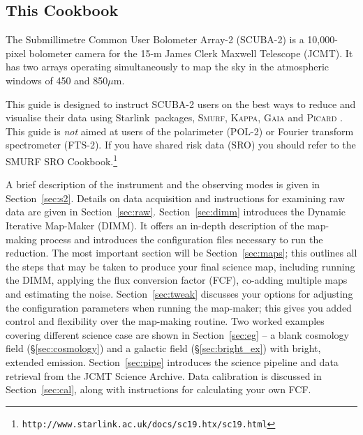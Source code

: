 \documentclass[twoside,11pt]{article}
\newcommand{\htmladdnormallink}[2]{#1}
\newcommand{\htmlref}[2]{#1}
\newenvironment{latexonly}{}{}
\newcommand{\latex}[1]{#1}
\newcommand{\latexhtml}[2]{#1}
\newcommand{\xref}[3]{#1}
\newcommand{\xlabel}[1]{}
\renewcommand{\_}{\texttt{\symbol{95}}}
\newcommand{\starlink}{\htmladdnormallink{Starlink}{http://starlink.jach.hawaii.edu}}
\newcommand{\gaia}{\xref{\textsc{Gaia}}{sun214}{}}
\newcommand{\Kappa}{\xref{\textsc{Kappa}}{sun95}{}}
\newcommand{\picard}{\xref{\textsc{Picard}}{sun265}{}}
\newcommand{\smurf}{\xref{\textsc{Smurf}}{sun258}{}}
\newcommand{\cref}[3]{\latexhtml{#1~\ref{#2}}{\htmlref{#3}{#2}}}
\begin{document}
\subsection{\xlabel{using_guide}This Cookbook}

The Submillimetre Common User Bolometer Array-2 (SCUBA-2) is a
10,000-pixel bolometer camera for the 15-m James Clerk Maxwell
Telescope (JCMT). It has two arrays operating simultaneously to map
the sky in the atmospheric windows of 450 and 850$\mu$m.

This guide is designed to instruct SCUBA-2 users on the best ways to
reduce and visualise their data using \starlink\ packages,
\smurf \cite{smurf}, \Kappa \cite{kappa}, \gaia \cite{gaia} and \picard
\cite{picard}.  This guide is {\em not} aimed at users of the
polarimeter (POL-2) or Fourier transform spectrometer (FTS-2). If you
have shared risk data (SRO) you should refer to the
\xref{SMURF SRO
Cookbook.}{sc19}{}\latex{\footnote{\texttt{http://www.starlink.ac.uk/docs/sc19.htx/sc19.html}}}

A brief description of the instrument and the observing modes is given
in \cref{Section}{sec:s2}{an Overview}. Details on data acquisition and
instructions for examining raw data are given in
\cref{Section}{sec:raw}{Raw SCUBA-2 data}.
\cref{Section}{sec:dimm}{This page} introduces the Dynamic Iterative Map-Maker
(DIMM). It offers an in-depth description of the map-making
process and introduces the configuration files necessary to run the
reduction. The most important section will be
\cref{Section}{sec:maps}{Reducing your data};
this outlines all the steps that may be taken to produce your final
science map, including running the DIMM, applying the flux conversion
factor (FCF), co-adding multiple maps and estimating the noise.
\cref{Section}{sec:tweak}{Tweaking the configuration file}
discusses your options for adjusting the configuration
parameters when running the map-maker; this gives you added control
and flexibility over the map-making routine. Two worked examples
covering different science case are shown in
\cref{Section}{sec:eg}{Examples} -- a
\htmlref{blank cosmology field}{sec:cosmology}
\begin{latexonly}
(\S\ref{sec:cosmology})
\end{latexonly}
and a \htmlref{galactic field}{sec:bright_ex}
\begin{latexonly}
(\S\ref{sec:bright_ex})
\end{latexonly}
with bright, extended emission.
\cref{Section}{sec:pipe}{SCUBA-2 Pipeline} introduces the science
pipeline and data retrieval from the JCMT Science Archive.  Data
calibration is discussed in \cref{Section}{sec:cal}{SCUBA-2 data
calibration}, along with instructions for calculating your own FCF.
\end{document}
